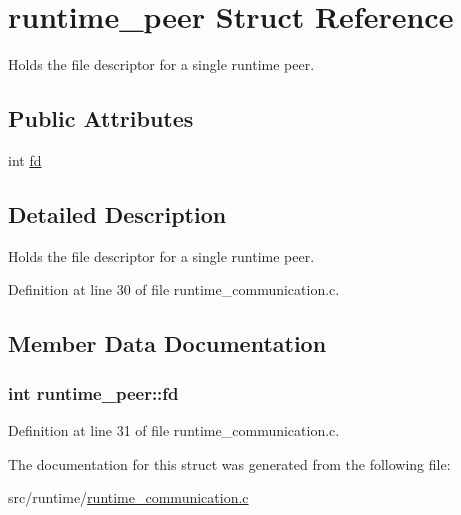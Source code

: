 \hypertarget{structruntime__peer}{\section{runtime\-\_\-peer Struct Reference}
\label{structruntime__peer}
}


Holds the file descriptor for a single runtime peer.  


\subsection*{Public Attributes}
\begin{DoxyCompactItemize}
\item 
int \hyperlink{structruntime__peer_a1d013fd0bf36999603d22509df266e38}{fd}
\end{DoxyCompactItemize}


\subsection{Detailed Description}
Holds the file descriptor for a single runtime peer. 

Definition at line 30 of file runtime\-\_\-communication.\-c.



\subsection{Member Data Documentation}
\hypertarget{structruntime__peer_a1d013fd0bf36999603d22509df266e38}{
\subsubsection[{fd}]{\setlength{\rightskip}{0pt plus 5cm}int runtime\-\_\-peer\-::fd}}\label{structruntime__peer_a1d013fd0bf36999603d22509df266e38}


Definition at line 31 of file runtime\-\_\-communication.\-c.



The documentation for this struct was generated from the following file\-:\begin{DoxyCompactItemize}
\item 
src/runtime/\hyperlink{runtime_2runtime__communication_8c}{runtime\-\_\-communication.\-c}\end{DoxyCompactItemize}

